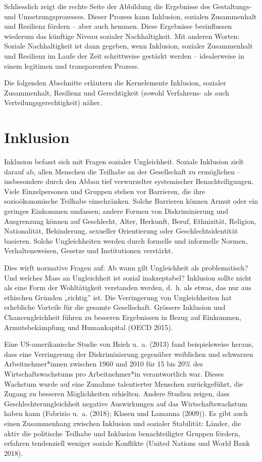 \documentclass[
  nswissgerman,
  a4paper,
  openany]{book}
\begin{document}
Schliesslich zeigt die rechte Seite der Abbildung die Ergebnisse des
Gestaltungs- und Umsetzungsprozesses. Dieser Prozess kann Inklusion,
sozialen Zusammenhalt und Resilienz fördern -- aber auch hemmen. Diese
Ergebnisse beeinflussen wiederum das künftige Niveau sozialer
Nachhaltigkeit. Mit anderen Worten: Soziale Nachhaltigkeit ist dann
gegeben, wenn Inklusion, sozialer Zusammenhalt und Resilienz im Laufe
der Zeit schrittweise gestärkt werden -- idealerweise in einem legitimen
und transparenten Prozess.

Die folgenden Abschnitte erläutern die Kernelemente Inklusion, sozialer
Zusammenhalt, Resilienz und Gerechtigkeit (sowohl Verfahrens- als auch
Verteilungsgerechtigkeit) näher.

\section{Inklusion}\label{inklusion}

Inklusion befasst sich mit Fragen sozialer Ungleichheit. Soziale
Inklusion zielt darauf ab, allen Menschen die Teilhabe an der
Gesellschaft zu ermöglichen -- insbesondere durch den Abbau tief
verwurzelter systemischer Benachteiligungen. Viele Einzelpersonen und
Gruppen stehen vor Barrieren, die ihre sozioökonomische Teilhabe
einschränken. Solche Barrieren können Armut oder ein geringes Einkommen
umfassen; andere Formen von Diskriminierung und Ausgrenzung können auf
Geschlecht, Alter, Herkunft, Beruf, Ethnizität, Religion, Nationalität,
Behinderung, sexueller Orientierung oder Geschlechtsidentität basieren.
Solche Ungleichheiten werden durch formelle und informelle Normen,
Verhaltensweisen, Gesetze und Institutionen verstärkt.

Dies wirft normative Fragen auf: Ab wann gilt Ungleichheit als
problematisch? Und welches Mass an Ungleichheit ist sozial inakzeptabel?
Inklusion sollte nicht als eine Form der Wohltätigkeit verstanden
werden, d.~h. als etwas, das nur aus ethischen Gründen „richtig'' ist.
Die Verringerung von Ungleichheiten hat erhebliche Vorteile für die
gesamte Gesellschaft. Grössere Inklusion und Chancengleichheit führen zu
besseren Ergebnissen in Bezug auf Einkommen, Armutsbekämpfung und
Humankapital (OECD 2015).

Eine US-amerikanische Studie von Hsieh u.~a. (2013) fand beispielsweise
heraus, dass eine Verringerung der Diskriminierung gegenüber weiblichen
und schwarzen Arbeitnehmer*innen zwischen 1960 und 2010 für 15 bis 20\%
des Wirtschaftswachstums pro Arbeitnehmer*in verantwortlich war. Dieses
Wachstum wurde auf eine Zunahme talentierter Menschen zurückgeführt, die
Zugang zu besseren Möglichkeiten erhielten. Andere Studien zeigen, dass
Geschlechterungleichheit negative Auswirkungen auf das
Wirtschaftswachstum haben kann (Fabrizio u.~a. (2018); Klasen und
Lamanna (2009)). Es gibt auch einen Zusammenhang zwischen Inklusion und
sozialer Stabilität: Länder, die aktiv die politische Teilhabe und
Inklusion benachteiligter Gruppen fördern, erfahren tendenziell weniger
soziale Konflikte (United Nations und World Bank 2018).
\end{document}
